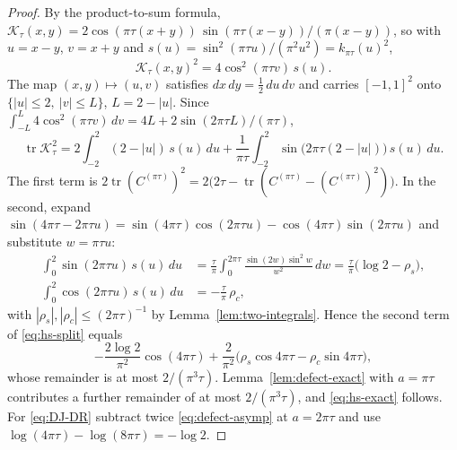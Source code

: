 \begin{proof}
By the product-to-sum formula,
$\mathcal K_\tau(x,y)=2\cos(\pi\tau(x+y))\,\sin(\pi\tau(x-y))/(\pi(x-y))$,
so with $u=x-y$, $v=x+y$ and $s(u)=\sin^2(\pi\tau u)/(\pi^2u^2)=k_{\pi\tau}(u)^2$,
\[
 \mathcal K_\tau(x,y)^2=4\cos^2(\pi\tau v)\,s(u).
\]
The map $(x,y)\mapsto(u,v)$ satisfies $dx\,dy=\tfrac12\,du\,dv$ and carries $[-1,1]^2$
onto $\{|u|\le2,\ |v|\le L\}$, $L=2-|u|$.  Since
$\int_{-L}^L4\cos^2(\pi\tau v)\,dv=4L+2\sin(2\pi\tau L)/(\pi\tau)$,
\begin{equation}\label{eq:hs-split}
 \operatorname{tr}\mathcal K_\tau^2
 =2\int_{-2}^2(2-|u|)\,s(u)\,du
 +\frac1{\pi\tau}\int_{-2}^2\sin\bigl(2\pi\tau(2-|u|)\bigr)\,s(u)\,du .
\end{equation}
The first term is $2\operatorname{tr}(C^{(\pi\tau)})^2
=2\bigl(2\tau-\operatorname{tr}(C^{(\pi\tau)}-(C^{(\pi\tau)})^2)\bigr)$.
In the second, expand
$\sin(4\pi\tau-2\pi\tau u)=\sin(4\pi\tau)\cos(2\pi\tau u)-\cos(4\pi\tau)\sin(2\pi\tau u)$
and substitute $w=\pi\tau u$:
\begin{align*}
 \int_0^2\sin(2\pi\tau u)\,s(u)\,du
 &=\frac\tau\pi\int_0^{2\pi\tau}\frac{\sin(2w)\sin^2w}{w^2}\,dw
 =\frac\tau\pi\bigl(\log2-\rho_s\bigr),\\
 \int_0^2\cos(2\pi\tau u)\,s(u)\,du&=-\frac\tau\pi\,\rho_c ,
\end{align*}
with $|\rho_s|,|\rho_c|\le(2\pi\tau)^{-1}$ by Lemma~\ref{lem:two-integrals}.
Hence the second term of \eqref{eq:hs-split} equals
\[
 -\frac{2\log2}{\pi^2}\cos(4\pi\tau)
 +\frac{2}{\pi^2}\bigl(\rho_s\cos4\pi\tau-\rho_c\sin4\pi\tau\bigr),
\]
whose remainder is at most $2/(\pi^3\tau)$.  Lemma~\ref{lem:defect-exact}
with $a=\pi\tau$ contributes a further remainder of at most $2/(\pi^3\tau)$,
and \eqref{eq:hs-exact} follows.  For \eqref{eq:DJ-DR} subtract twice
\eqref{eq:defect-asymp} at $a=2\pi\tau$ and use
$\log(4\pi\tau)-\log(8\pi\tau)=-\log2$.
\end{proof}


